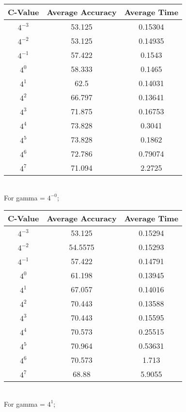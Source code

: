 \documentclass[letter,11pt]{article}
\begin{document}
\begin{tabular}{|c| c |c |} 
	\hline
	C-Value & Average Accuracy & Average Time \\ [0.5ex] 			
	\hline
	$4^{-3}$ & 53.125  & 0.15304 \\ [0.5ex] 
	\hline
	$4^{-2}$ & 53.125 & 0.14935  \\ 
	\hline
	$4^{-1}$ & 57.422 	  & 0.1543\\
	\hline
	$4^{0}$ &  58.333  & 0.1465\\
	\hline
	$4^{1}$ & 62.5  & 0.14031\\
	\hline
	$4^{2}$ & 66.797   & 0.13641\\
	\hline
	$4^{3}$ &  71.875  & 0.16753\\
	\hline
	$4^{4}$ & 73.828  & 0.3041\\
	\hline
	$4^{5}$ &    73.828    & 0.1862\\
	\hline
	$4^{6}$ &     72.786    & 0.79074\\
	\hline
	$4^{7}$ & 71.094 & 2.2725\\
	\hline	
\end{tabular}\\

For gamma = $4^{-0}$;

\begin{tabular}{|c| c |c |} 
	\hline
	C-Value & Average Accuracy & Average Time \\ [0.5ex] 			
	\hline
	$4^{-3}$ & 53.125  & 0.15294 \\ [0.5ex] 
	\hline
	$4^{-2}$ & 54.5575 & 0.15293  \\ 
	\hline
	$4^{-1}$ & 57.422  	  & 0.14791\\
	\hline
	$4^{0}$ & 61.198  & 0.13945\\
	\hline
	$4^{1}$ & 67.057  & 0.14016\\
	\hline
	$4^{2}$ & 70.443   & 0.13588\\
	\hline
	$4^{3}$ &  70.443   & 0.15595\\
	\hline
	$4^{4}$ & 70.573  & 0.25515\\
	\hline
	$4^{5}$ &   70.964    & 0.53631\\
	\hline
	$4^{6}$ &   70.573      & 1.713\\
	\hline
	$4^{7}$ & 68.88 & 5.9055\\
	\hline	
\end{tabular}\\


For gamma = $4^{1}$;
\end{document}
